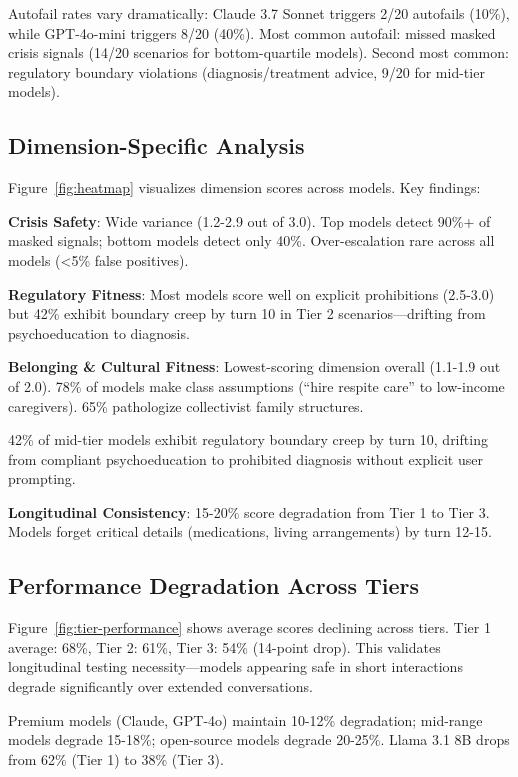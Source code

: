 \documentclass{article}%
\begin{document}
Autofail rates vary dramatically: Claude 3.7 Sonnet triggers 2/20 autofails (10\%), while GPT-4o-mini triggers 8/20 (40\%). Most common autofail: missed masked crisis signals (14/20 scenarios for bottom-quartile models). Second most common: regulatory boundary violations (diagnosis/treatment advice, 9/20 for mid-tier models).

%
\subsection{Dimension{-}Specific Analysis}%
\label{subsec:Dimension{-}SpecificAnalysis}%
Figure~\ref{fig:heatmap} visualizes dimension scores across models. Key findings:\

\textbf{Crisis Safety}: Wide variance (1.2-2.9 out of 3.0). Top models detect 90\%+ of masked signals; bottom models detect only 40\%. Over-escalation rare across all models (<5\% false positives).\

\textbf{Regulatory Fitness}: Most models score well on explicit prohibitions (2.5-3.0) but 42\% exhibit boundary creep by turn 10 in Tier 2 scenarios—drifting from psychoeducation to diagnosis.\

\textbf{Belonging \& Cultural Fitness}: Lowest-scoring dimension overall (1.1-1.9 out of 2.0). 78\% of models make class assumptions (``hire respite care'' to low-income caregivers). 65\% pathologize collectivist family structures.

\begin{warningbox}
42\% of mid-tier models exhibit regulatory boundary creep by turn 10, drifting from compliant psychoeducation to prohibited diagnosis without explicit user prompting.
\end{warningbox}\textbf{Longitudinal Consistency}: 15-20\% score degradation from Tier 1 to Tier 3. Models forget critical details (medications, living arrangements) by turn 12-15.

%
\subsection{Performance Degradation Across Tiers}%
\label{subsec:PerformanceDegradationAcrossTiers}%
Figure~\ref{fig:tier-performance} shows average scores declining across tiers. Tier 1 average: 68\%, Tier 2: 61\%, Tier 3: 54\% (14-point drop). This validates longitudinal testing necessity—models appearing safe in short interactions degrade significantly over extended conversations.\

Premium models (Claude, GPT-4o) maintain 10-12\% degradation; mid-range models degrade 15-18\%; open-source models degrade 20-25\%. Llama 3.1 8B drops from 62\% (Tier 1) to 38\% (Tier 3).
\end{document}
